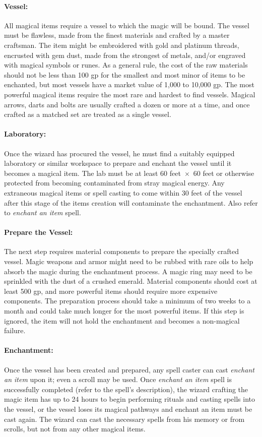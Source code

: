 \begin{multicols}{2}
\paragraph{Vessel:} All magical items require a vessel to which the magic will be bound.  The vessel must be flawless, made from the finest materials and crafted by a master craftsman.  The item might be embroidered with gold and platinum threads, encrusted with gem dust, made from the strongest of metals, and/or engraved with magical symbols or runes.  As a general rule, the cost of the raw materials should not be less than 100 gp for the smallest and most minor of items to be enchanted, but most vessels have a market value of 1,000 to 10,000 gp. The most powerful magical items require the most rare and hardest to find vessels.  Magical arrows, darts and bolts are usually crafted a dozen or more at a time, and once crafted as a matched set are treated as a single vessel. 

\paragraph{Laboratory:} Once the wizard has procured the vessel, he must find a suitably equipped laboratory or similar workspace to prepare and enchant the vessel until it becomes a magical item.  The lab must be at least 60 feet~$\times$~60 feet or otherwise protected from becoming contaminated from stray magical energy.  Any extraneous magical items or spell casting to come within 30 feet of the vessel after this stage of the items creation will contaminate the enchantment.  Also refer to \textit{enchant an item} spell.  

\paragraph{Prepare the Vessel:} The next step requires material components to prepare the specially crafted vessel.  Magic weapons and armor might need to be rubbed with rare oils to help absorb the magic during the enchantment process.  A magic ring may need to be sprinkled with the dust of a crushed emerald.  Material components should cost at least 500 gp, and more powerful items should require more expensive components.  The preparation process should take a minimum of two weeks to a month and could take much longer for the most powerful items.  If this step is ignored, the item will not hold the enchantment and becomes a non-magical failure.

\paragraph{Enchantment:} Once the vessel has been created and prepared, any spell caster can cast \textit{enchant an item} upon it; even a scroll may be used.  Once \textit{enchant an item} spell is successfully completed (refer to the spell's description), the wizard crafting the magic item has up to 24 hours to begin performing rituals and casting spells into the vessel, or the vessel loses its magical pathways and enchant an item must be cast again.  The wizard can cast the necessary spells from his memory or from scrolls, but not from any other magical items.


\end{multicols}

